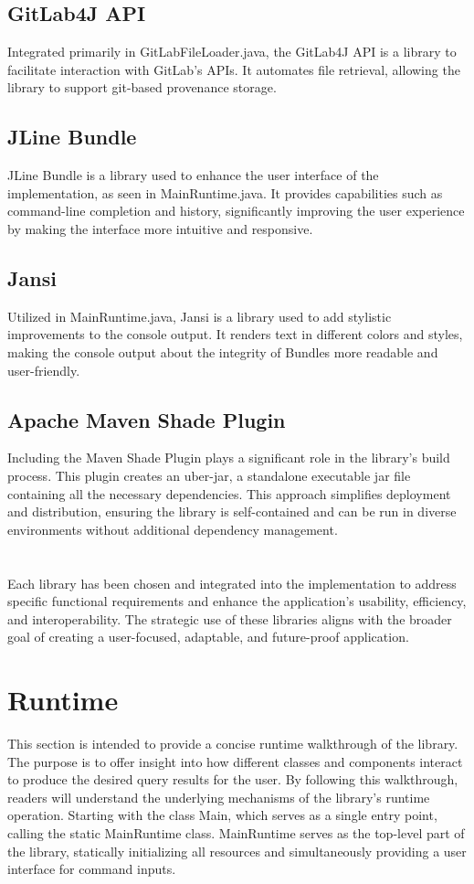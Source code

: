 \documentclass[
  digital,     %
  oneside,     %
  nosansbold,  %
  nocolorbold, %
  lof,         %
  lot,         %
]{fithesis4}
\begin{document}
\subsection{GitLab4J API}
Integrated primarily in GitLabFileLoader.java, the GitLab4J API is a library to facilitate interaction with GitLab's APIs. It automates file retrieval, allowing the library to support git-based provenance storage.
\subsection{JLine Bundle}
JLine Bundle is a library used to enhance the user interface of the implementation, as seen in MainRuntime.java. It provides capabilities such as command-line completion and history, significantly improving the user experience by making the interface more intuitive and responsive.
\subsection{Jansi}
Utilized in MainRuntime.java, Jansi is a library used to add stylistic improvements to the console output. It renders text in different colors and styles, making the console output about the integrity of Bundles more readable and user-friendly.
\subsection{Apache Maven Shade Plugin}
Including the Maven Shade Plugin plays a significant role in the library's build process. This plugin creates an uber-jar, a standalone executable jar file containing all the necessary dependencies. This approach simplifies deployment and distribution, ensuring the library is self-contained and can be run in diverse environments without additional dependency management.


\section*{}
Each library has been chosen and integrated into the implementation to address specific functional requirements and enhance the application's usability, efficiency, and interoperability. The strategic use of these libraries aligns with the broader goal of creating a user-focused, adaptable, and future-proof application.

\section{Runtime}
This section is intended to provide a concise runtime walkthrough of the library. The purpose is to offer insight into how different classes and components interact to produce the desired query results for the user. By following this walkthrough, readers will understand the underlying mechanisms of the library's runtime operation. Starting with the class Main, which serves as a single entry point, calling the static MainRuntime class. MainRuntime serves as the top-level part of the library, statically initializing all resources and simultaneously providing a user interface for command inputs.
\end{document}
